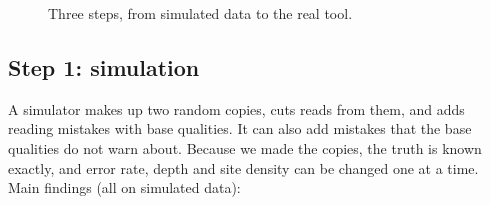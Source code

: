 \documentclass[11pt]{article}
\begin{document}
\begin{figure}[h]
\centering
{}
\caption{Three steps, from simulated data to the real tool.}
\label{fig:steps}
\end{figure}

\subsection{Step 1: simulation}

A simulator makes up two random copies, cuts reads from them, and adds
reading mistakes with base qualities. It can also add mistakes that the base
qualities do not warn about. Because we made the copies, the truth is known
exactly, and error rate, depth and site density can be changed one at a
time. Main findings (all on simulated data):
\end{document}
